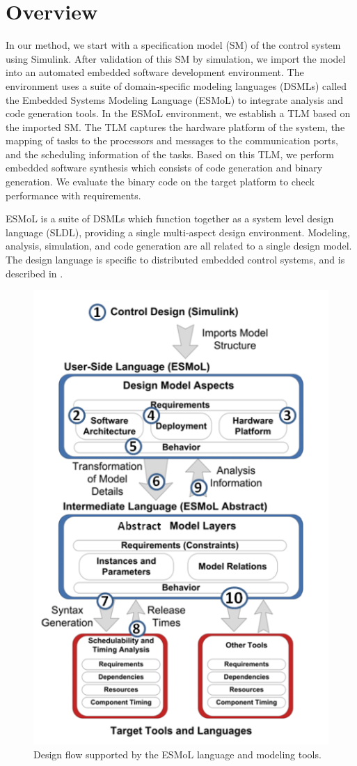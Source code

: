 \documentclass{acm_proc_article-sp}
\begin{document}
\section{Overview}
In our method, we start with a specification model (SM) of the control system using Simulink. After validation of this SM by simulation, we import the model into an automated embedded software development environment. The environment uses a suite of domain-specific modeling languages (DSMLs) called the Embedded Systems Modeling Language (ESMoL) to integrate analysis and code generation tools. In the ESMoL environment, we establish a TLM based on the imported SM. The TLM captures the hardware platform of the system, the mapping of tasks to the processors and messages to the communication ports, and the scheduling information of the tasks. Based on this TLM, we perform embedded software synthesis which consists of code generation and binary generation. We evaluate the binary code on the target platform to check performance with requirements.

ESMoL is a suite of DSMLs which function together as a system level design language (SLDL), providing a single multi-aspect design environment. Modeling, analysis, simulation, and code generation are all related to a single design model. The design language is specific to distributed embedded control systems, and is described in \cite{modeling:esmol}.

\begin{figure}[!t]
\centering
\includegraphics[width=0.80\columnwidth]{figures/designflow.png}
\caption{Design flow supported by the ESMoL language and modeling tools.}
\label{fig:designflow}
\end{figure}
\end{document}
